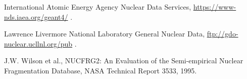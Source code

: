  International Atomic Energy Agency Nuclear Data Services,
                      \url{https://www-nds.iaea.org/geant4/} .

 Lawrence Livermore National Laboratory General Nuclear Data,
                         \url{ftp://gdo-nuclear.ucllnl.org/pub} .

 J.W. Wilson et al., NUCFRG2: An Evaluation of the
                       Semi-empirical Nuclear Fragmentation Database, NASA
                       Technical Report 3533, 1995.












